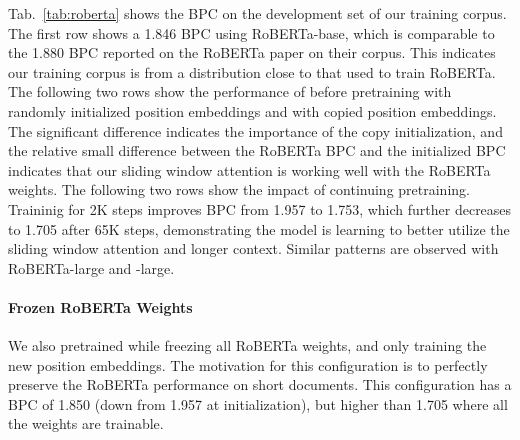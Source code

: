 Tab.~\ref{tab:roberta} shows the BPC on the development 
set of our training corpus. The first row shows a 1.846 BPC using 
RoBERTa-base, which is comparable to the 1.880 BPC reported
on the RoBERTa paper on their corpus. This indicates 
our training corpus is from a distribution close to that used to train RoBERTa.
The following two rows show the performance of \model
before pretraining 
with randomly initialized position embeddings and with 
copied position embeddings. The significant difference indicates the importance of the copy initialization, and the relative small difference between the RoBERTa BPC and the initialized BPC indicates that our sliding window attention is working well with the RoBERTa weights.
The following two rows show the impact of continuing pretraining. 
Traininig for 2K steps improves BPC from 1.957 to 1.753, which further decreases to 1.705 after 65K steps, demonstrating the model is learning to better utilize the sliding window attention and longer context.
Similar patterns are observed with RoBERTa-large and \model-large.




\paragraph{Frozen RoBERTa Weights}
We also pretrained \model while freezing all RoBERTa weights, and only training the new position embeddings.  The motivation for this configuration is to perfectly preserve 
the RoBERTa performance on short documents.
This configuration has a BPC of 1.850 (down from 1.957 at initialization), but higher than 1.705 where all the weights 
are trainable.
 



